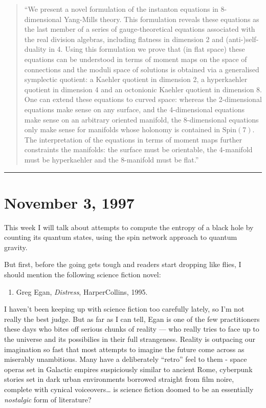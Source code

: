 \documentclass{article}
\def\tightlist{}
\begin{document}
\begin{quote}
``We present a novel formulation of the instanton equations in
8-dimensional Yang-Mills theory. This formulation reveals these
equations as the last member of a series of gauge-theoretical equations
associated with the real division algebras, including flatness in
dimension 2 and (anti-)self-duality in 4. Using this formulation we
prove that (in flat space) these equations can be understood in terms of
moment maps on the space of connections and the moduli space of
solutions is obtained via a generalised symplectic quotient: a Kaehler
quotient in dimension 2, a hyperkaehler quotient in dimension 4 and an
octonionic Kaehler quotient in dimension 8. One can extend these
equations to curved space: whereas the 2-dimensional equations make
sense on any surface, and the 4-dimensional equations make sense on an
arbitrary oriented manifold, the 8-dimensional equations only make sense
for manifolds whose holonomy is contained in \(\mathrm{Spin}(7)\). The
interpretation of the equations in terms of moment maps further
constraints the manifolds: the surface must be orientable, the
4-manifold must be hyperkaehler and the 8-manifold must be flat.''
\end{quote}

\begin{center}\rule{0.5\linewidth}{0.5pt}\end{center}
\hypertarget{week112}{%
\section{November 3, 1997}\label{week112}}

This week I will talk about attempts to compute the entropy of a black
hole by counting its quantum states, using the spin network approach to
quantum gravity.

But first, before the going gets tough and readers start dropping like
flies, I should mention the following science fiction novel:

\begin{enumerate}
\def\labelenumi{\arabic{enumi})}
\tightlist
\item
  Greg Egan, \emph{Distress}, HarperCollins, 1995.
\end{enumerate}

I haven't been keeping up with science fiction too carefully lately, so
I'm not really the best judge. But as far as I can tell, Egan is one of
the few practitioners these days who bites off serious chunks of reality
--- who really tries to face up to the universe and its possibilies in
their full strangeness. Reality is outpacing our imagination so fast
that most attempts to imagine the future come across as miserably
unambitious. Many have a deliberately ``retro'' feel to them - space
operas set in Galactic empires suspiciously similar to ancient Rome,
cyberpunk stories set in dark urban environments borrowed straight from
film noire, complete with cynical voiceovers\ldots{} is science fiction
doomed to be an essentially \emph{nostalgic} form of literature?
\end{document}
